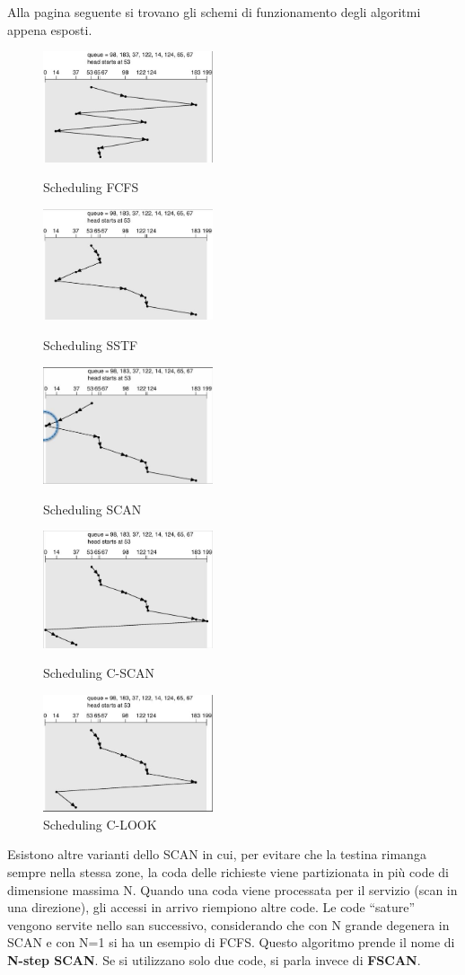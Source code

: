 \documentclass[a4paper]{article}
\begin{document}
Alla pagina seguente si trovano gli schemi di funzionamento degli algoritmi appena esposti.
\begin{figure}
   \centering
   \includegraphics[width=5cm]{img/fcfs.JPG}
   \caption{Scheduling FCFS}
   \includegraphics[width=5cm]{img/sstf.JPG}
   \caption{Scheduling SSTF}
   \includegraphics[width=5cm]{img/scan.JPG}
   \caption{Scheduling SCAN}
   \includegraphics[width=5cm]{img/cscan.JPG}
   \caption{Scheduling C-SCAN}
   \includegraphics[width=5cm]{img/clook.JPG}
   \caption{Scheduling C-LOOK}
\end{figure}
\newline

Esistono altre varianti dello SCAN in cui, per evitare che la testina rimanga sempre nella stessa zone, la coda delle richieste viene partizionata in più code di dimensione massima N. Quando una coda viene processata per il servizio (scan in una direzione), gli accessi in arrivo riempiono altre code. Le code ``sature'' vengono servite nello san successivo, considerando che con N grande degenera in SCAN e con N=1 si ha un esempio di FCFS. Questo algoritmo prende il nome di \textbf{N-step SCAN}. Se si utilizzano solo due code, si parla invece di \textbf{FSCAN}.
\end{document}

